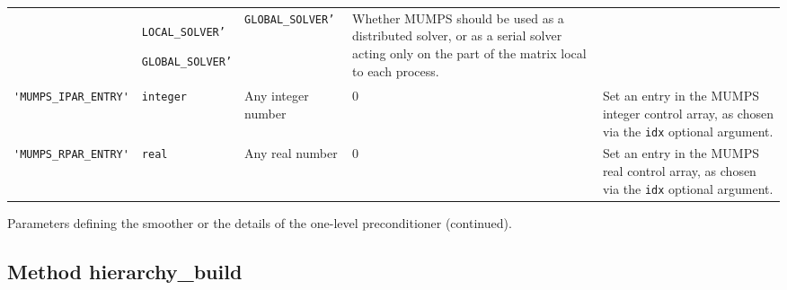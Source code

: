 \begin{center}
\begin{tabular}{|p{3cm}|l|p{2.5cm}|p{2.2cm}|p{7.1cm}|}
                         & \texttt{LOCAL\_SOLVER'} \par \texttt{GLOBAL\_SOLVER'}
                         & \texttt{GLOBAL\_SOLVER'}
                         & Whether MUMPS should be used as a
                           distributed solver, or as a serial solver
                           acting only on the part of the matrix local
                           to each process. \\ %
\verb|'MUMPS_IPAR_ENTRY'|  & \verb|integer|
                         & Any integer  number
                         & 0
                         & Set an entry in the MUMPS integer control array, as
                           chosen via the \verb|idx| optional argument. \\ %
\verb|'MUMPS_RPAR_ENTRY'|  & \verb|real|
                         & Any real number
                         & 0
                         & Set an entry in the MUMPS real control array, as
                           chosen via the \verb|idx| optional argument. \\ %
\hline
\end{tabular}
\end{center}
\caption{Parameters defining the smoother or the details of the one-level preconditioner
(continued).\label{tab:p_smoother_1}}  
\esideways


\clearpage

\subsection{Method hierarchy\_build\label{sec:hier_bld}}
  
